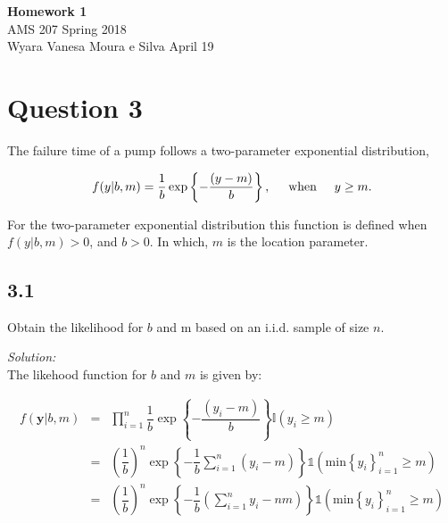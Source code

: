 \documentclass[a4paper, 11pt]{article}
\begin{document}
\noindent
{\Large\textbf{Homework 1} \hfill \\
AMS 207 \hfill Spring 2018 \\
Wyara Vanesa Moura e Silva \hfill April 19\\}

\section*{Question 3}

The failure time of a pump follows a two-parameter exponential distribution, 

\begin{equation*}
f(y|b,m) = \dfrac{1}{b} \exp\left\{-\dfrac{(y-m)}{b}\right\}, \hspace{0.5cm} \mbox{when} \hspace{0.5cm} y\geq m.
\end{equation*}

For the two-parameter exponential distribution this function is defined when $f(y|b,m)>0$, and $b>0$. In which, $m$ is the location parameter.

\subsection*{3.1} Obtain the likelihood for $b$ and m based on an i.i.d. sample of size $n$.

\noindent
\textit{Solution:}\\

The likehood function for $b$ and $m$ is given by:

\begin{equation*}
\begin{array}{lclll}
f(\textbf{y}|b,m) & = & \displaystyle\prod_{i=1}^{n} \dfrac{1}{b} \exp\left\{-\dfrac{(y_i-m)}{b}\right\} \mathds{I} \left( y_i\geq m\right) \\
& = & \left(\dfrac{1}{b}\right)^n \exp\left\{-\dfrac{1}{b}\displaystyle\sum_{i=1}^{n}(y_i-m)\right\}  \mathds{1} \left(\mbox{min}\left\{ y_i \right\}^{n}_{i=1}\geq m\right)  \\
& = & \left(\dfrac{1}{b}\right)^n \exp\left\{-\dfrac{1}{b}\left(\displaystyle\sum_{i=1}^{n}y_i - nm\right)\right\}  \mathds{1} \left(\mbox{min}\left\{ y_i \right\}^{n}_{i=1}\geq m\right)  \\
\end{array}
\end{equation*}
\end{document}
